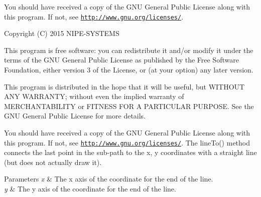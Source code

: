 You should have received a copy of the G\+N\+U General Public License along with this program. If not, see \href{http://www.gnu.org/licenses/}{\tt http\+://www.\+gnu.\+org/licenses/}.

Copyright (C) 2015 N\+I\+P\+E-\/\+S\+Y\+S\+T\+E\+M\+S

This program is free software\+: you can redistribute it and/or modify it under the terms of the G\+N\+U General Public License as published by the Free Software Foundation, either version 3 of the License, or (at your option) any later version.

This program is distributed in the hope that it will be useful, but W\+I\+T\+H\+O\+U\+T A\+N\+Y W\+A\+R\+R\+A\+N\+T\+Y; without even the implied warranty of M\+E\+R\+C\+H\+A\+N\+T\+A\+B\+I\+L\+I\+T\+Y or F\+I\+T\+N\+E\+S\+S F\+O\+R A P\+A\+R\+T\+I\+C\+U\+L\+A\+R P\+U\+R\+P\+O\+S\+E. See the G\+N\+U General Public License for more details.

You should have received a copy of the G\+N\+U General Public License along with this program. If not, see \href{http://www.gnu.org/licenses/}{\tt http\+://www.\+gnu.\+org/licenses/}. The line\+To() method connects the last point in the sub-\/path to the x, y coordinates with a straight line (but does not actually draw it). 
\begin{DoxyParams}{Parameters}
{\em x} & The x axis of the coordinate for the end of the line. \\
\hline
{\em y} & The y axis of the coordinate for the end of the line. \\
\hline
\end{DoxyParams}
